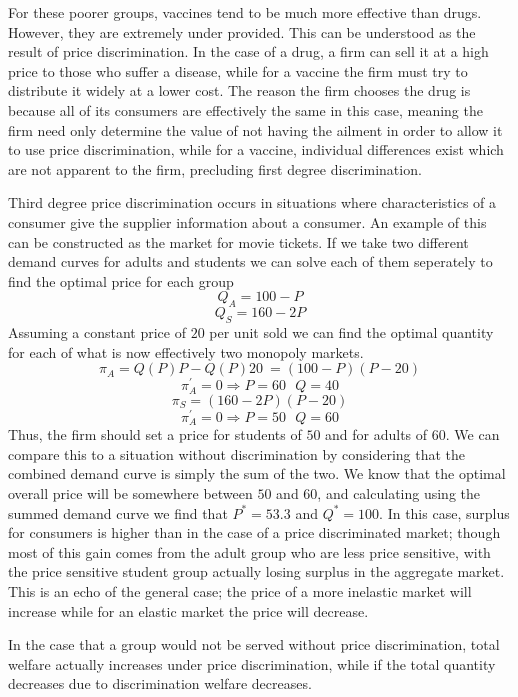 \documentclass[12pt]{report}
\begin{document}
\begin{flushleft}
\bigskip
For these poorer groups, vaccines tend to be much more effective than drugs.
However, they are extremely under provided. This can be understood as the
result of price discrimination. In the case of a drug, a firm can sell it at
a high price to those who suffer a disease, while for a vaccine the firm must
try to distribute it widely at a lower cost. The reason the firm chooses the
drug is because all of its consumers are effectively the same in this case,
meaning the firm need only determine the value of not having the ailment in
order to allow it to use price discrimination, while for a vaccine, individual
differences exist which are not apparent to the firm, precluding first degree
discrimination.

\bigskip
Third degree price discrimination occurs in situations where characteristics of
a consumer give the supplier information about a consumer. An example of this 
can be constructed as the market for movie tickets. If we take two different
demand curves for adults and students we can solve each of them seperately to
find the optimal price for each group
\[Q_A = 100 - P\]
\[Q_S = 160 - 2P\]
Assuming a constant price of \(20\) per unit sold we can find the optimal 
quantity for each of what is now effectively two monopoly markets.
\[\pi_A = Q(P)P - Q(P)20\ = (100 - P)(P - 20)\]
\[\pi_A^\prime = 0 \Rightarrow P = 60 \:\:\: Q = 40\]
\[\pi_S = (160 - 2P)(P - 20)\]
\[\pi_A^\prime = 0 \Rightarrow P = 50 \:\:\: Q = 60\]
Thus, the firm should set a price for students of \(50\) and for adults of 
\(60\). We can compare this to a situation without discrimination by 
considering that the combined demand curve is simply the sum of the two.
We know that the optimal overall price will be somewhere between \(50\) and
\(60\), and calculating using the summed demand curve we find that 
\(P^* = 53.3\) and \(Q^* = 100\). In this case, surplus for consumers is 
higher than in the case of a price discriminated market; though most of this
gain comes from the adult group who are less price sensitive, with the price
sensitive student group actually losing surplus in the aggregate market. This
is an echo of the general case; the price of a more inelastic market will 
increase while for an elastic market the price will decrease.

\bigskip
In the case that a group would not be served without price discrimination,
total welfare actually increases under price discrimination, while if the
total quantity decreases due to discrimination welfare decreases.

\end{flushleft}
\end{document}

